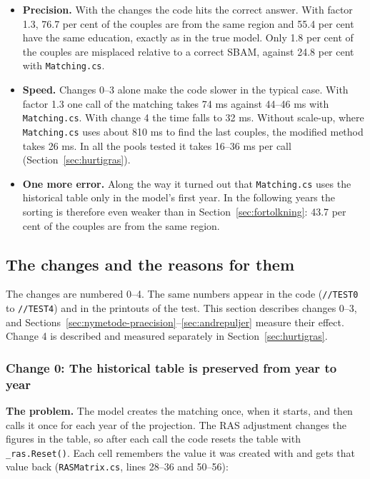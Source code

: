 \documentclass[12pt,a4paper]{article}
\newcommand{\kode}[1]{\texttt{#1}}
\begin{document}
\begin{itemize}
\item \textbf{Precision.} With the changes the code hits the correct answer. With factor 1.3, 76.7
per cent of the couples are from the same region and 55.4 per cent have the same education, exactly
as in the true model. Only 1.8 per cent of the couples are misplaced relative to a correct SBAM,
against 24.8 per cent with \kode{Matching.cs}.
\item \textbf{Speed.} Changes 0--3 alone make the code slower in the typical case. With factor 1.3
one call of the matching takes 74 ms against 44--46 ms with \kode{Matching.cs}. With change 4 the
time falls to 32 ms. Without scale-up, where \kode{Matching.cs} uses about 810 ms to find the last
couples, the modified method takes 26 ms. In all the pools tested it takes 16--36 ms per call
(Section~\ref{sec:hurtigras}).
\item \textbf{One more error.} Along the way it turned out that \kode{Matching.cs} uses the
historical table only in the model's first year. In the following years the sorting is therefore
even weaker than in Section~\ref{sec:fortolkning}: 43.7 per cent of the couples are from the same
region.
\end{itemize}

\subsection{The changes and the reasons for them}\label{sec:aendringer}

The changes are numbered 0--4. The same numbers appear in the code (\kode{//TEST0} to
\kode{//TEST4}) and in the printouts of the test. This section describes changes 0--3, and
Sections~\ref{sec:nymetode-praecision}--\ref{sec:andrepuljer} measure their effect. Change 4 is
described and measured separately in Section~\ref{sec:hurtigras}.

\subsubsection*{Change 0: The historical table is preserved from year to year}

\textbf{The problem.} The model creates the matching once, when it starts, and then calls it once
for each year of the projection. The RAS adjustment changes the figures in the table, so after each
call the code resets the table with \kode{\_ras.Reset()}. Each cell remembers the value it was
created with and gets that value back (\kode{RASMatrix.cs}, lines 28--36 and 50--56):
\end{document}
